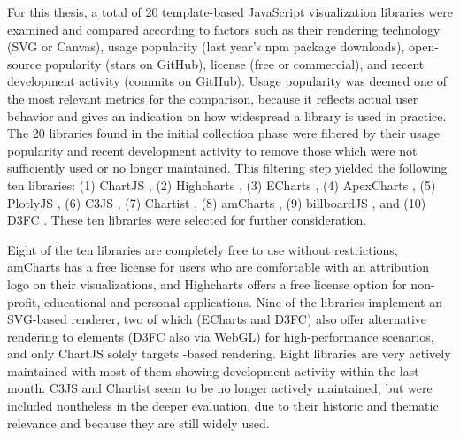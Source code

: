 For this thesis, a total of 20 template-based JavaScript visualization
libraries were examined and compared according to factors such as
their rendering technology (SVG or Canvas), usage popularity (last
year's npm package downloads), open-source popularity (stars on
GitHub), license (free or commercial), and recent development activity
(commits on GitHub). Usage popularity was deemed one of the most
relevant metrics for the comparison, because it reflects actual user
behavior and gives an indication on how widespread a library is used
in practice. The 20 libraries found in the initial collection phase
were filtered by their usage popularity and recent development
activity to remove those which were not sufficiently used or no longer
maintained. This filtering step yielded the following ten libraries:
(1) ChartJS \parencite{ChartJS}, (2) Highcharts
\parencite{Highcharts}, (3) ECharts \parencite{ECharts}, (4)
ApexCharts \parencite{ApexCharts}, (5) PlotlyJS \parencite{PlotlyJS},
(6) C3JS \parencite{C3JS}, (7) Chartist \parencite{Chartist}, (8)
amCharts \parencite{amCharts}, (9) billboardJS
\parencite{billboardJS}, and (10) D3FC \parencite{D3FC}. These ten
libraries were selected for further consideration.

Eight of the ten libraries are completely free to use without
restrictions, amCharts has a free license for users who are
comfortable with an attribution logo on their visualizations, and
Highcharts offers a free license option for non-profit, educational
and personal applications. Nine of the libraries implement an
SVG-based renderer, two of which (ECharts and D3FC) also offer
alternative rendering to  elements (D3FC also via
WebGL) for high-performance scenarios, and only ChartJS solely targets
-based rendering. Eight libraries are very actively
maintained with most of them showing development activity within the
last month. C3JS and Chartist seem to be no longer actively
maintained, but were included nontheless in the deeper evaluation, due
to their historic and thematic relevance and because they are still
widely used.

